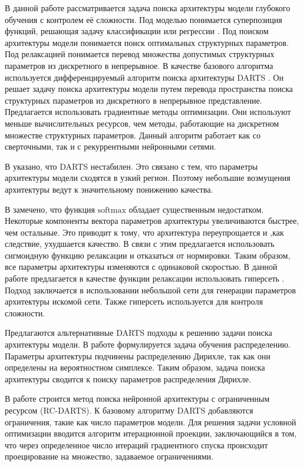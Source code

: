 \documentclass[12pt, twoside]{article}
\begin{document}
В данной работе рассматривается задача поиска архитектуры модели глубокого обучения с контролем её сложности. Под моделью понимается суперпозиция функций, решающая задачу классификации или регрессии \cite{journals/aarc/BakhteevS18}. Под поиском архитектуры модели понимается поиск оптимальных структурных параметров. Под релаксацией понимается перевод множества допустимых структурных параметров из дискретного в непрерывное. В качестве базового алгоритма используется дифференцируемый алгоритм поиска архитектуры DARTS \cite{journals/corr/abs-1806-09055}. Он решает задачу поиска архитектуры модели путем перевода пространства поиска структурных параметров из дискретного в непрерывное представление. Предлагается использовать градиентные методы оптимизации. Они используют меньше вычислительных ресурсов, чем методы, работающие на дискретном множестве структурных параметров. Данный алгоритм работает как со сверточными, так и с рекуррентными нейронными сетями.

В \cite{journals/corr/abs-2002-05283} указано, что DARTS нестабилен. Это связано с тем, что параметры архитектуры модели сходятся в узкий регион. Поэтому небольшие возмущения архитектуры ведут к значительному понижению качества.

В \cite{journals/corr/abs-1911-12126} замечено, что функция $\text{softmax}$ обладает существенным недостатком. Некоторые компоненты вектора параметров архитектуры увеличиваются быстрее, чем остальные. Это приводит к тому, что архитектура переупрощается и ,как следствие, ухудшается качество\cite{journals/corr/abs-1911-12126}. В связи с этим предлагается использовать сигмоидную  функцию релаксации и отказаться от нормировки. Таким образом, все параметры архитектуры изменяются с одинаковой скоростью. В данной работе предлагается в качестве функции релаксации использовать гиперсеть \cite{journals/corr/HaDL16}. Подход заключается в использовании небольшой сети для генерации параметров архитектуры искомой сети. Также гиперсеть используется для контроля сложности.

 Предлагаются альтернативные DARTS подходы к решению задачи поиска архитектуры модели. В работе \cite{journals/corr/abs-2006-10355} формулируется задача обучения распределению. Параметры архитектуры подчинены распределению Дирихле, так как они определены на вероятностном симплексе. Таким образом, задача поиска архитектуры сводится к поиску параметров распределения Дирихле.

В работе \cite{journals/corr/abs-1912-12814} строится метод поиска нейронной архитектуры с ограниченным ресурсом (RC-DARTS). К базовому алгоритму DARTS добавляются ограничения, такие как число параметров модели. Для решения задачи условной оптимизации вводится алгоритм итерационной проекции, заключающийся в том, что через определенное число итераций градиентного спуска происходит проецирование на множество, задаваемое ограничениями.
\end{document}
